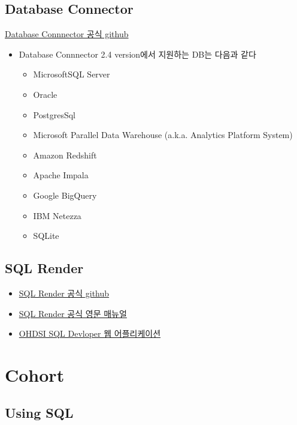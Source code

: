 \documentclass[]{book}
\providecommand{\tightlist}{%
  \setlength{\itemsep}{0pt}\setlength{\parskip}{0pt}}
\begin{document}
\hypertarget{database-connector}{%
\section{Database Connector}\label{database-connector}}

\href{https://github.com/ohdsi/databaseconnector}{Database Connnector 공식 github}

\begin{itemize}
\tightlist
\item
  Database Connnector 2.4 version에서 지원하는 DB는 다음과 같다

  \begin{itemize}
  \tightlist
  \item
    MicrosoftSQL Server
  \item
    Oracle
  \item
    PostgresSql
  \item
    Microsoft Parallel Data Warehouse (a.k.a. Analytics Platform System)
  \item
    Amazon Redshift
  \item
    Apache Impala
  \item
    Google BigQuery
  \item
    IBM Netezza
  \item
    SQLite
  \end{itemize}
\end{itemize}

\hypertarget{sql-render}{%
\section{SQL Render}\label{sql-render}}

\begin{itemize}
\tightlist
\item
  \href{https://github.com/ohdsi/sqlrender}{SQL Render 공식 github}
\item
  \href{https://ohdsi.github.io/SqlRender/}{SQL Render 공식 영문 매뉴얼}
\item
  \href{http://data.ohdsi.org/SqlDeveloper/}{OHDSI SQL Devloper 웹 어플리케이션}
\end{itemize}

\hypertarget{cohort}{%
\chapter{Cohort}\label{cohort}}

\hypertarget{using-sql}{%
\section{Using SQL}\label{using-sql}}
\end{document}
